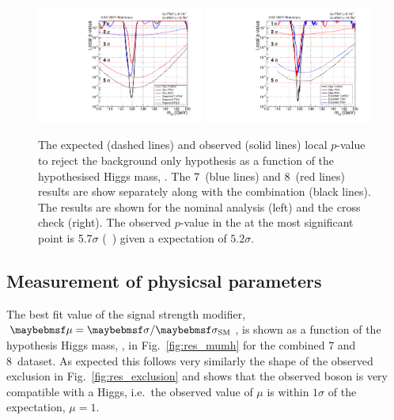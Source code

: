 \begin{figure}
  \includegraphics[width=0.49\textwidth]{analysis/plots/results/obspvalue.pdf}
  \includegraphics[width=0.49\textwidth]{analysis/plots/results/obspvalue_sideband.pdf}
  \caption{The expected (dashed lines) and observed (solid lines) local $p$-value to reject the background only hypothesis as a function of the hypothesised Higgs mass, \mH. The 7~\TeV (blue lines) and 8~\TeV (red lines) results are show separately along with the combination (black lines). The results are shown for the nominal \MFM analysis (left) and the cross check \SMVA (right). The observed $p$-value in the \MFM at the most significant point is 5.7$\sigma$ (~\GeV) given a \SM expectation of $5.2\sigma$. \plotupdate}
  \label{fig:res_pvalue}
\end{figure}

\subsection{Measurement of physicsal parameters}

The best fit value of the signal strength modifier, $\mu=\musm$, is shown as a function of the hypothesis Higgs mass, \mH, in Fig.~\ref{fig:res_mumh} for the combined 7 and 8~\TeV dataset. As expected this follows very similarly the shape of the observed exclusion in Fig.~\ref{fig:res_exclusion} and shows that the observed boson is very compatible with a \SM Higgs, i.e.~the observed value of $\mu$ is within $1\sigma$ of the \SM expectation, $\mu=1$. 

